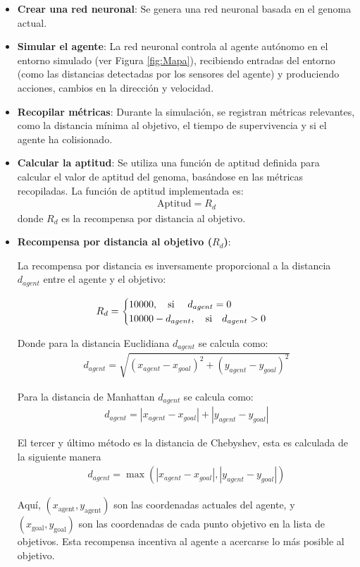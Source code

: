 \documentclass[lettersize, journal]{IEEEtran}
\begin{document}
\begin{itemize} 
\item \textbf{Crear una red neuronal}: Se genera una red neuronal basada en el genoma actual. 
\item \textbf{Simular el agente}: La red neuronal controla al agente autónomo en el entorno simulado (ver Figura \ref{fig:Mapa}), recibiendo entradas del entorno (como las distancias detectadas por los sensores del agente) y produciendo acciones, cambios en la dirección y velocidad. 
\item \textbf{Recopilar métricas}: Durante la simulación, se registran métricas relevantes, como la distancia mínima al objetivo, el tiempo de supervivencia y si el agente ha colisionado. 
\item \textbf{Calcular la aptitud}: Se utiliza una función de aptitud definida para calcular el valor de aptitud del genoma, basándose en las métricas recopiladas. 
La función de aptitud implementada es:
\begin{align*} 
    \text{Aptitud} = R_d
\end{align*}
donde $R_d$ es la recompensa por distancia al objetivo. 

\item \textbf{Recompensa por distancia al objetivo ($R_d$)}:

La recompensa por distancia es inversamente proporcional a la distancia $d_{agent}$ entre el agente y el objetivo:

\begin{align*} 
R_d = \begin{cases} 
10000, \quad \text{si } \quad d_{agent} = 0 
\cr 10000-d_{agent}, \quad \text{si} \quad d_{agent} > 0 
\end{cases} 
\end{align*}

Donde para la distancia Euclidiana $d_{agent}$ se calcula como:
\begin{align*} 
    d_{agent} = {\sqrt{(x_{agent} - x_{goal})^2 + (y_{agent} - y_{goal})^2}} 
\end{align*}

Para la distancia de Manhattan $d_{agent}$ se calcula como:
\begin{align*} 
    d_{agent} = |x_{agent} - x_{goal}| + |y_{agent} - y_{goal}|
\end{align*}

El tercer y último método es la distancia de Chebyshev, esta es calculada de la siguiente manera 
\begin{align*} 
    d_{agent} = \max(|x_{agent} - x_{goal}|, |y_{agent} - y_{goal}|)
\end{align*}



Aquí, $(x_{\text{agent}}, y_{\text{agent}})$ son las coordenadas actuales del agente, y $(x_{\text{goal}}, y_{\text{goal}})$ son las coordenadas de cada punto objetivo en la lista de objetivos. Esta recompensa incentiva al agente a acercarse lo más posible al objetivo.\\
\end{itemize}
\end{document}
